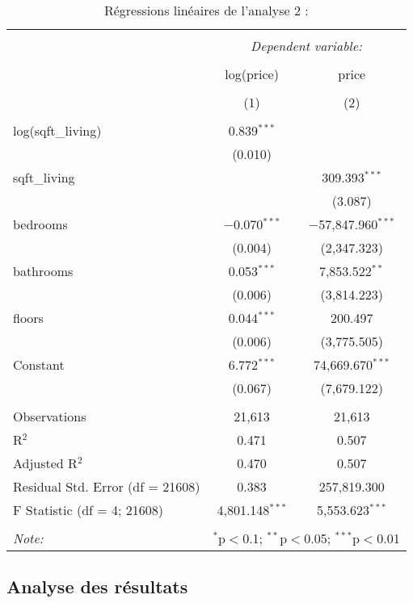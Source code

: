 \documentclass[
  11pt,
  french,
]{article}
\begin{document}
\begin{table}[!htbp] \centering 
  \caption{Régressions linéaires de l'analyse 2 :} 
  \label{} 
\small 
\begin{tabular}{@{\extracolsep{1pt}}lcc} 
\\[-1.8ex]\hline 
\hline \\[-1.8ex] 
 & \multicolumn{2}{c}{\textit{Dependent variable:}} \\ 
\cline{2-3} 
\\[-1.8ex] & log(price) & price \\ 
\\[-1.8ex] & (1) & (2)\\ 
\hline \\[-1.8ex] 
 log(sqft\_living) & 0.839$^{***}$ &  \\ 
  & (0.010) &  \\ 
  sqft\_living &  & 309.393$^{***}$ \\ 
  &  & (3.087) \\ 
  bedrooms & $-$0.070$^{***}$ & $-$57,847.960$^{***}$ \\ 
  & (0.004) & (2,347.323) \\ 
  bathrooms & 0.053$^{***}$ & 7,853.522$^{**}$ \\ 
  & (0.006) & (3,814.223) \\ 
  floors & 0.044$^{***}$ & 200.497 \\ 
  & (0.006) & (3,775.505) \\ 
  Constant & 6.772$^{***}$ & 74,669.670$^{***}$ \\ 
  & (0.067) & (7,679.122) \\ 
 \hline \\[-1.8ex] 
Observations & 21,613 & 21,613 \\ 
R$^{2}$ & 0.471 & 0.507 \\ 
Adjusted R$^{2}$ & 0.470 & 0.507 \\ 
Residual Std. Error (df = 21608) & 0.383 & 257,819.300 \\ 
F Statistic (df = 4; 21608) & 4,801.148$^{***}$ & 5,553.623$^{***}$ \\ 
\hline 
\hline \\[-1.8ex] 
\textit{Note:}  & \multicolumn{2}{r}{$^{*}$p$<$0.1; $^{**}$p$<$0.05; $^{***}$p$<$0.01} \\ 
\end{tabular} 
\end{table}

\newpage

\hypertarget{analyse-des-ruxe9sultats-2}{%
\subsection{Analyse des résultats}\label{analyse-des-ruxe9sultats-2}}
\end{document}
